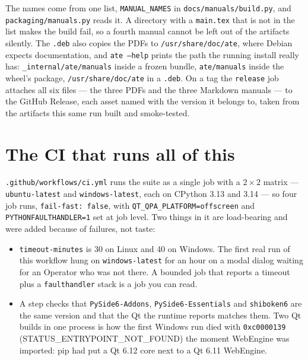 The names come from one list, \texttt{MANUAL\_\allowbreak{}NAMES} in
\texttt{docs/\allowbreak{}manuals/\allowbreak{}build.py}, and \texttt{packaging/\allowbreak{}manuals.py} reads it. A directory with a
\texttt{main.tex} that is not in the list makes the build fail, so a fourth manual cannot be left out
of the artifacts silently. The \texttt{.deb} also copies the PDFs to
\texttt{/usr/share/\allowbreak{}doc/ate}, where Debian expects documentation, and \texttt{ate --help} prints the
path the running install really has: \texttt{\_internal/ate/manuals} inside a frozen bundle,
\texttt{ate/manuals} inside the wheel's package, \texttt{/usr/share/doc/ate} in a \texttt{.deb}. On a tag
the \texttt{release} job attaches all six files --- the three PDFs and the three Markdown manuals ---
to the GitHub Release, each asset named with the version it belongs to, taken from the artifacts this
same run built and smoke-tested.

\section{The CI that runs all of this}

\texttt{.github/\allowbreak{}workflows/\allowbreak{}ci.yml} runs the suite as a single job with a
$2 \times 2$ matrix --- \texttt{ubuntu-latest} and \texttt{windows-latest}, each on CPython 3.13 and
3.14 --- so four job runs, \texttt{fail-fast: false}, with
\texttt{QT\_\allowbreak{}QPA\_\allowbreak{}PLATFORM=offscreen} and \texttt{PYTHONFAULTHANDLER=1} set at job level. Two things in it
are load-bearing and were added because of failures, not taste:

\begin{itemize}
  \item \texttt{timeout-minutes} is 30 on Linux and 40 on Windows. The first real run of this workflow
    hung on \texttt{windows-latest} for an hour on a modal dialog waiting for an Operator who was not
    there. A bounded job that reports a timeout plus a \texttt{faulthandler} stack is a job you can read.
  \item A step checks that \texttt{PySide6-Addons}, \texttt{PySide6-Essentials} and \texttt{shiboken6} are
    the same version and that the Qt the runtime reports matches them. Two Qt builds in one process is how
    the first Windows run died with \texttt{0xc0000139} (STATUS\_ENTRYPOINT\_NOT\_FOUND) the moment
    WebEngine was imported: pip had put a Qt 6.12 core next to a Qt 6.11 WebEngine.
\end{itemize}

